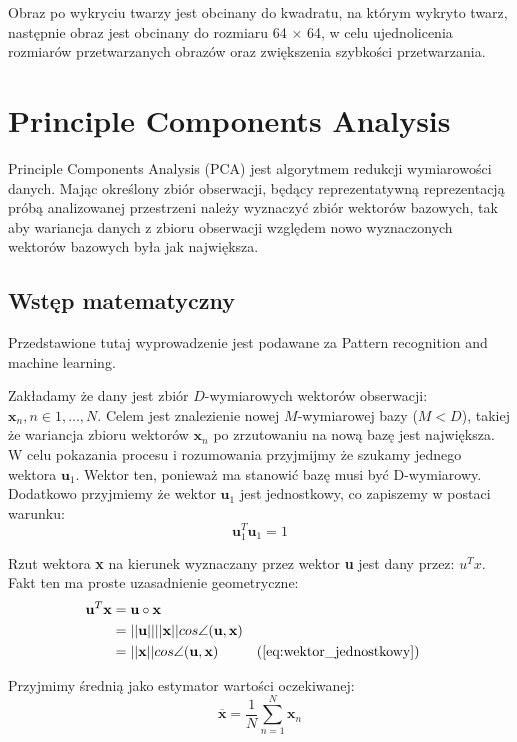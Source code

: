 \documentclass[oneside, eng]{mgr}
\newcommand{\bb}{\textbf}
\begin{document}
Obraz po wykryciu twarzy jest obcinany do kwadratu, na którym wykryto twarz, następnie obraz jest obcinany do rozmiaru 64 $\times$ 64, w celu ujednolicenia rozmiarów przetwarzanych obrazów oraz zwiększenia szybkości przetwarzania.
 
\section{Principle Components Analysis}

Principle Components Analysis (PCA) jest algorytmem redukcji wymiarowości danych. Mając określony zbiór obserwacji, będący reprezentatywną reprezentacją próbą analizowanej przestrzeni należy wyznaczyć zbiór wektorów bazowych, tak aby wariancja danych z zbioru obserwacji względem nowo wyznaczonych wektorów bazowych była jak największa.

\subsection{Wstęp matematyczny}

Przedstawione tutaj wyprowadzenie jest podawane za Pattern recognition and machine learning.

Zakładamy że dany jest zbiór $D$-wymiarowych wektorów obserwacji: $\bb{x}_n , n \in 1,...,N $. Celem jest znalezienie nowej $M$-wymiarowej bazy ($M < D$), takiej że wariancja zbioru wektorów $\bb{x}_n$ po zrzutowaniu na nową bazę jest największa. W celu pokazania procesu i rozumowania przyjmijmy że szukamy jednego wektora $\bb{u}_1$. Wektor ten, ponieważ ma stanowić bazę musi być D-wymiarowy. Dodatkowo przyjmiemy że wektor $\bb{u}_1$ jest jednostkowy, co zapiszemy w postaci warunku:
\begin{equation} \label{eq:wektor_jednostkowy}
	\bb{u}_1^{T}\bb{u}_1 = 1
\end{equation}

Rzut wektora \bb{x} na kierunek wyznaczany przez wektor \bb{u} jest dany przez: $u^{T}x$. Fakt ten ma proste uzasadnienie geometryczne:
\begin{align*}	
	\bb{u}^{T} \bb{x} &= \bb{u} \circ \bb{x} \\
		   & = ||\bb{u}|| ||\bb{x}|| cos \angle (\bb{u}, \bb{x}) \index{1} \\
		   &= ||\bb{x}|| cos \angle (\bb{u}, \bb{x}) \index{1} && \text{(\ref{eq:wektor_jednostkowy})}
\end{align*}

Przyjmimy średnią jako estymator wartości oczekiwanej:
\begin{equation}	\overline{\bb{x}} = \frac{1}{N} \sum_{n=1}^{N} \bb{x}_n \end{equation}
\end{document}
